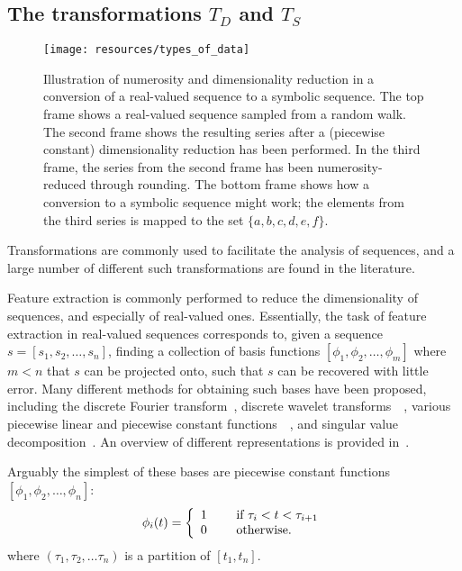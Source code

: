 \subsection{The transformations $T_D$ and $T_S$}

\begin{figure}[htb]
  \begin{center}
    \leavevmode
    \texttt{[image: resources/types\_of\_data]}
  \end{center}
  \caption{\small{Illustration of numerosity and dimensionality reduction in a conversion of a real-valued sequence to a symbolic sequence. The top frame shows a real-valued sequence sampled from a random walk. The second frame shows the resulting series after a (piecewise constant) dimensionality reduction has been performed. In the third frame, the series from the second frame has been numerosity-reduced through rounding. The bottom frame shows how a conversion to a symbolic sequence might work; the elements from the third series is mapped to the set $\{a,b,c,d,e,f\}$.}}
\label{fig:types_of_data}
\end{figure}

Transformations are commonly used to facilitate the analysis of sequences, and a large number of different such transformations are found in the literature.

Feature extraction is commonly performed to reduce the dimensionality of sequences, and especially of real-valued ones. Essentially, the task of feature extraction in real-valued sequences corresponds to, given a sequence $s = [s_1, s_2, \dots, s_n]$, finding a collection of basis functions $[\phi_1, \phi_2, \dots, \phi_m]$ where $m < n$ that $s$ can be projected onto, such that $s$ can be recovered with little error. Many different methods for obtaining such bases have been proposed, including the discrete Fourier transform~\cite{faloutsos1}, discrete wavelet transforms~\cite{pong}~\cite{fu}, various piecewise linear and piecewise constant functions~\cite{keogh3}~\cite{geurts}, and singular value decomposition~\cite{keogh3}. An overview of different representations is provided in~\cite{fabian}.

Arguably the simplest of these bases are piecewise constant functions $[\phi_1, \phi_2, \dots, \phi_n]$:
\[
  \phi_i(t) = \left\{
    \begin{array}{l l}
      1 & \quad \text{ if } \tau_i < t < \tau_{i+1} \\
      0 & \quad \text{ otherwise.} \\
    \end{array} \right.
\]
where $(\tau_1, \tau_2, \dots \tau_n)$ is a partition of $[t_1, t_n]$.

